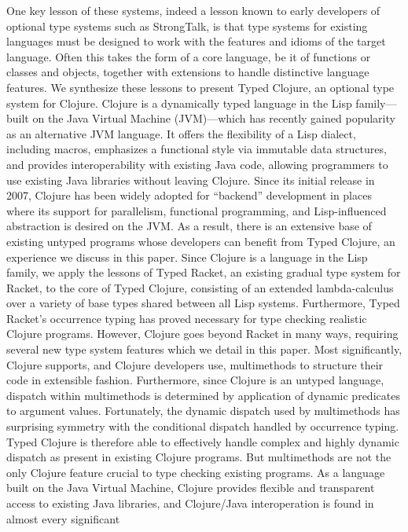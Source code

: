 One key lesson of these systems, indeed a lesson known to early developers of
optional type systems such as StrongTalk, is that type systems for existing
languages must be designed to work with the features and idioms of the target
language. Often this takes the form of a core language, be it of functions or
classes and objects, together with extensions to handle distinctive language
features. We synthesize these lessons to present Typed Clojure, an optional type
system for Clojure. Clojure is a dynamically typed language in the Lisp
family—built on the Java Virtual Machine (JVM)—which has recently gained
popularity as an alternative JVM language. It offers the flexibility of a Lisp
dialect, including macros, emphasizes a functional style via immutable data
structures, and provides interoperability with existing Java code, allowing
programmers to use existing Java libraries without leaving Clojure. Since its
initial release in 2007, Clojure has been widely adopted for “backend”
development in places where its support for parallelism, functional programming,
and Lisp-influenced abstraction is desired on the JVM. As a result, there is an
extensive base of existing untyped programs whose developers can benefit from
Typed Clojure, an experience we discuss in this paper. Since Clojure is a
language in the Lisp family, we apply the lessons of Typed Racket, an existing
gradual type system for Racket, to the core of Typed Clojure, consisting of an
extended lambda-calculus over a variety of base types shared between all Lisp
systems. Furthermore, Typed Racket’s occurrence typing has proved necessary for
type checking realistic Clojure programs. However, Clojure goes beyond Racket in
many ways, requiring several new type system features which we detail in this
paper. Most significantly, Clojure supports, and Clojure developers use,
multimethods to structure their code in extensible fashion. Furthermore, since
Clojure is an untyped language, dispatch within multimethods is determined by
application of dynamic predicates to argument values. Fortunately, the dynamic
dispatch used by multimethods has surprising symmetry with the conditional
dispatch handled by occurrence typing. Typed Clojure is therefore able to
effectively handle complex and highly dynamic dispatch as present in existing
Clojure programs. But multimethods are not the only Clojure feature crucial to
type checking existing programs. As a language built on the Java Virtual
Machine, Clojure provides flexible and transparent access to existing Java
libraries, and Clojure/Java interoperation is found in almost every significant
